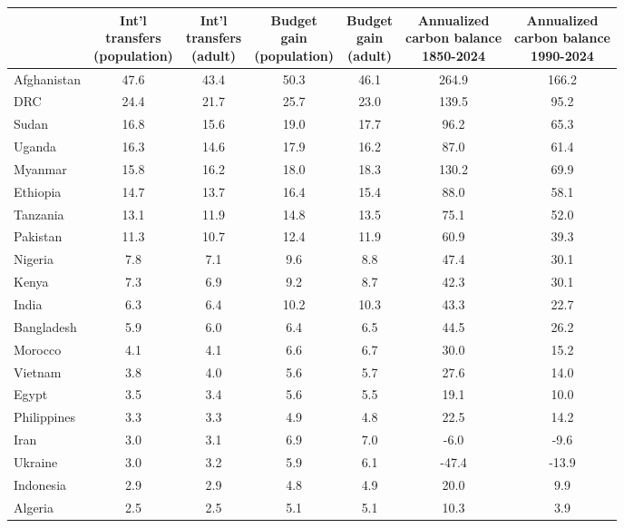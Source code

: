\documentclass[12pt,english]{article}
\begin{document}
\begin{bibunit}
\begin{table}[!h]
{\begin{tabular}[t]{lcccccc}
\toprule
  & \makecell{Int'l\\transfers\\(population)} & \makecell{Int'l\\transfers\\(adult)} & \makecell{Budget\\gain\\(population)} & \makecell{Budget\\gain\\(adult)} & \makecell{Annualized\\carbon balance\\1850-2024} & \makecell{Annualized\\carbon balance\\1990-2024}\\
\midrule
Afghanistan & 47.6 & 43.4 & 50.3 & 46.1 & 264.9 & 166.2\\
DRC & 24.4 & 21.7 & 25.7 & 23.0 & 139.5 & 95.2\\
Sudan & 16.8 & 15.6 & 19.0 & 17.7 & 96.2 & 65.3\\
Uganda & 16.3 & 14.6 & 17.9 & 16.2 & 87.0 & 61.4\\
Myanmar & 15.8 & 16.2 & 18.0 & 18.3 & 130.2 & 69.9\\
Ethiopia & 14.7 & 13.7 & 16.4 & 15.4 & 88.0 & 58.1\\
Tanzania & 13.1 & 11.9 & 14.8 & 13.5 & 75.1 & 52.0\\
Pakistan & 11.3 & 10.7 & 12.4 & 11.9 & 60.9 & 39.3\\
Nigeria & 7.8 & 7.1 & 9.6 & 8.8 & 47.4 & 30.1\\
Kenya & 7.3 & 6.9 & 9.2 & 8.7 & 42.3 & 30.1\\
India & 6.3 & 6.4 & 10.2 & 10.3 & 43.3 & 22.7\\
Bangladesh & 5.9 & 6.0 & 6.4 & 6.5 & 44.5 & 26.2\\
Morocco & 4.1 & 4.1 & 6.6 & 6.7 & 30.0 & 15.2\\
Vietnam & 3.8 & 4.0 & 5.6 & 5.7 & 27.6 & 14.0\\
Egypt & 3.5 & 3.4 & 5.6 & 5.5 & 19.1 & 10.0\\
Philippines & 3.3 & 3.3 & 4.9 & 4.8 & 22.5 & 14.2\\
Iran & 3.0 & 3.1 & 6.9 & 7.0 & -6.0 & -9.6\\
Ukraine & 3.0 & 3.2 & 5.9 & 6.1 & -47.4 & -13.9\\
Indonesia & 2.9 & 2.9 & 4.8 & 4.9 & 20.0 & 9.9\\
Algeria & 2.5 & 2.5 & 5.1 & 5.1 & 10.3 & 3.9\\

\end{tabular}}
\end{table}
\end{bibunit}
\end{document}
